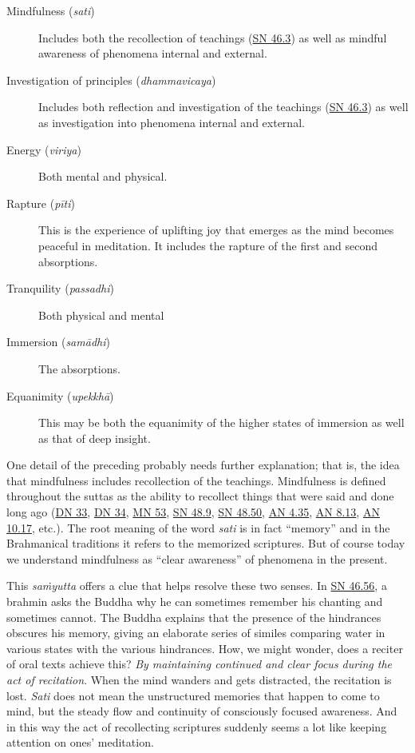 \documentclass[12pt,openany]{book}%
\begin{document}
\begin{description}%
\item[Mindfulness (\textit{sati})] Includes both the recollection of teachings (\href{https://suttacentral.net/sn46.3}{SN 46.3}) as well as mindful awareness of phenomena internal and external.%
\item[Investigation of principles (\textit{dhammavicaya})] Includes both reflection and investigation of the teachings (\href{https://suttacentral.net/sn46.3}{SN 46.3}) as well as investigation into phenomena internal and external.%
\item[Energy (\textit{viriya})] Both mental and physical.%
\item[Rapture (\textit{\textsanskrit{pīti}})] This is the experience of uplifting joy that emerges as the mind becomes peaceful in meditation. It includes the rapture of the first and second absorptions.%
\item[Tranquility (\textit{passadhi})] Both physical and mental%
\item[Immersion (\textit{\textsanskrit{samādhi}})] The absorptions.%
\item[Equanimity (\textit{\textsanskrit{upekkhā}})] This may be both the equanimity of the higher states of immersion as well as that of deep insight.%
\end{description}

One detail of the preceding probably needs further explanation; that is, the idea that mindfulness includes recollection of the teachings. Mindfulness is defined throughout the suttas as the ability to recollect things that were said and done long ago (\href{https://suttacentral.net/dn33}{DN 33}, \href{https://suttacentral.net/dn34}{DN 34}, \href{https://suttacentral.net/mn53}{MN 53}, \href{https://suttacentral.net/sn48.9}{SN 48.9}, \href{https://suttacentral.net/sn48.50}{SN 48.50}, \href{https://suttacentral.net/an4.35}{AN 4.35}, \href{https://suttacentral.net/an8.13}{AN 8.13}, \href{https://suttacentral.net/an10.17}{AN 10.17}, etc.). The root meaning of the word \textit{sati} is in fact “memory” and in the Brahmanical traditions it refers to the memorized scriptures. But of course today we understand mindfulness as “clear awareness” of phenomena in the present.

This \textit{\textsanskrit{saṁyutta}} offers a clue that helps resolve these two senses. In \href{https://suttacentral.net/sn46.56}{SN 46.56}, a brahmin asks the Buddha why he can sometimes remember his chanting and sometimes cannot. The Buddha explains that the presence of the hindrances obscures his memory, giving an elaborate series of similes comparing water in various states with the various hindrances. How, we might wonder, does a reciter of oral texts achieve this? \emph{By maintaining continued and clear focus during the act of recitation}. When the mind wanders and gets distracted, the recitation is lost. \textit{Sati} does not mean the unstructured memories that happen to come to mind, but the steady flow and continuity of consciously focused awareness. And in this way the act of recollecting scriptures suddenly seems a lot like keeping attention on ones’ meditation.
\end{document}
